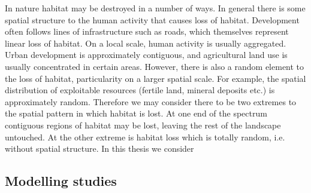 In nature habitat may be destroyed in a number of ways. In general there is some spatial structure to the human activity that causes loss of habitat. Development often follows lines of infrastructure such as roads, which themselves represent linear loss of habitat. On a local scale, human activity is usually aggregated. Urban development is approximately contiguous, and agricultural land use is usually concentrated in certain areas. However, there is also a random element to the loss of habitat, particularity on a larger spatial scale. For example, the spatial distribution of exploitable resources (fertile land, mineral deposits etc.) is approximately random. Therefore we may consider there to be two extremes to the spatial pattern in which habitat is lost. At one end of the spectrum contiguous regions of habitat may be lost, leaving the rest of the landscape untouched. At the other extreme is habitat loss which is totally random, i.e. without spatial structure. In this thesis we consider 



\subsection{Modelling studies}
\label{sec:intro_modelling_HL}

